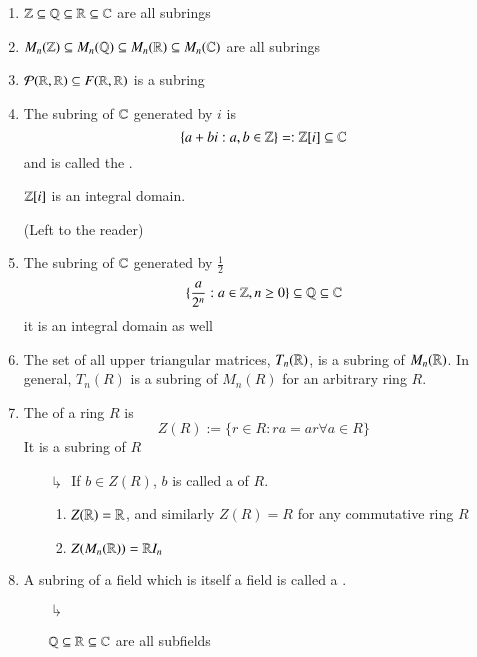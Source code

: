 \documentclass[12pt, a4paper, twoside, openright, titlepage]{book}
\begin{document}
\begin{eg}{}{}
    \leavevmode
    \begin{enumerate}
        \item $\mathbb Z\subseteq \mathbb Q\subseteq \mathbb R\subseteq \mathbb C$ are all subrings
        \item $M_n(\mathbb Z) \subseteq M_n(\mathbb Q) \subseteq M_n(\mathbb R) \subseteq M_n(\mathbb C)$ are all subrings
        \item $\mathcal{P}(\mathbb R,\mathbb R) \subseteq F(\mathbb R,\mathbb R)$ is a subring
        \item The subring of $\mathbb C$ generated by $i$ is \begin{equation}
            \{a+bi:a,b \in \mathbb Z\}=:\mathbb Z[i] \subseteq \mathbb C
        \end{equation}
        and is called the .
        \begin{xca*}{}{}
            $\mathbb Z[i]$ is an integral domain.
            \begin{proof*}{}{}
                    (Left to the reader)
            \end{proof*}
        \end{xca*}
        \item The subring of $\mathbb C$ generated by $\frac{1}{2}$ $$\{\frac{a}{2^n}:a \in \mathbb Z, n \geq 0\} \subseteq \mathbb Q \subseteq \mathbb C$$
        it is an integral domain as well
        \item The set of all upper triangular matrices, $T_n(\mathbb R)$, is a subring of $M_n(\mathbb R)$. In general, $T_n(R)$ is a subring of $M_n(R)$ for an arbitrary ring $R$.
        \item The  of a ring $R$ is \begin{equation}
            Z(R):= \{r \in R:ra =ar\forall a \in R\}
        \end{equation}
        It is a subring of $R$
        \begin{enumerate}
            \item[$\drsh$] If $b \in Z(R)$, $b$ is called a  of $R$.
            \begin{eg}{}{}
                \begin{enumerate}
                    \item $Z(\mathbb R) = \mathbb R$, and similarly $Z(R) = R$ for any commutative ring $R$
                    \item $Z(M_n(\mathbb R)) = \mathbb R I_n$
                \end{enumerate}
            \end{eg}
        \end{enumerate}
        \item A subring of a field which is itself a field is called a .
        \begin{enumerate}
            \item[$\drsh$] \begin{eg}{}{}
                $\mathbb Q\subseteq \mathbb R \subseteq \mathbb C$ are all subfields
            \end{eg} 
        \end{enumerate}
    \end{enumerate}
\end{eg}
\end{document}
